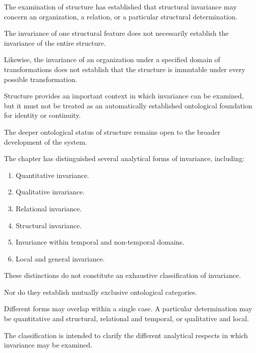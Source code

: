 
The examination of structure
has established that structural
invariance may concern an
organization, a relation, or
a particular structural
determination.

The invariance of one structural
feature does not necessarily
establish the invariance of
the entire structure.

Likewise, the invariance of
an organization under a specified
domain of transformations does
not establish that the structure
is immutable under every possible
transformation.

Structure provides an important
context in which invariance
can be examined, but it must
not be treated as an automatically
established ontological foundation
for identity or continuity.

The deeper ontological status
of structure remains open to
the broader development of
the system.


The chapter has distinguished
several analytical forms of
invariance, including:

\begin{enumerate}
    \item Quantitative invariance.
    \item Qualitative invariance.
    \item Relational invariance.
    \item Structural invariance.
    \item Invariance within temporal
    and non-temporal domains.
    \item Local and general invariance.
\end{enumerate}

These distinctions do not
constitute an exhaustive
classification of invariance.

Nor do they establish mutually
exclusive ontological categories.

Different forms may overlap
within a single case. A particular
determination may be quantitative
and structural, relational and
temporal, or qualitative and local.

The classification is intended
to clarify the different analytical
respects in which invariance
may be examined.

